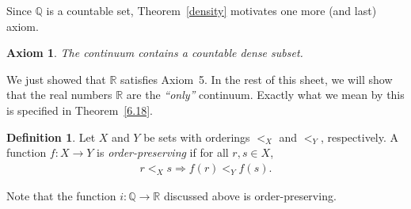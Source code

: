 \documentclass[11pt]{article}
\newcommand{\bbQ}{\mathbb{Q}}
\newcommand{\bbR}{\mathbb{R}}
\newcommand{\arr}{\longrightarrow}
\newtheorem{axiom}{Axiom}
\theoremstyle{definition}
\newtheorem{definition}[theorem]{Definition}
\numberwithin{equation}{subsection}
\begin{document}
Since $\bbQ$ is a countable set, Theorem~\ref{density} motivates one more (and last) axiom.

\setcounter{axiom}{4}
\begin{axiom}
	The continuum contains a countable dense subset.
\end{axiom}


We just showed that $\bbR$ satisfies Axiom~5. In the rest of this sheet, we will show that the real numbers $\bbR$ are the {\em ``only''} continuum. Exactly what we mean by this is specified in Theorem~\ref{6.18}.


\begin{definition}
	Let $X$ and $Y$ be sets with orderings $<_X$ and $<_Y$, respectively. A function $f\colon X \arr Y$ is \emph{order-preserving} if for all $r, s \in X$,
	\begin{align*}
		r <_X s \Longrightarrow f(r) <_Y f(s).
	\end{align*}
\end{definition}

Note that the function $i\colon \bbQ \arr \bbR$ discussed above is order-preserving.
\end{document}
